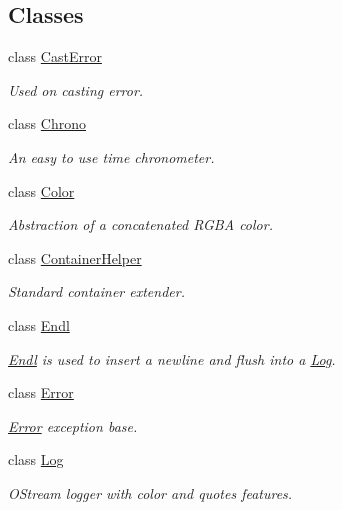 \subsection*{Classes}
\begin{DoxyCompactItemize}
\item 
class \mbox{\hyperlink{classo_a_1_1_cast_error}{Cast\+Error}}
\begin{DoxyCompactList}\small\item\em Used on casting error. \end{DoxyCompactList}\item 
class \mbox{\hyperlink{classo_a_1_1_chrono}{Chrono}}
\begin{DoxyCompactList}\small\item\em An easy to use time chronometer. \end{DoxyCompactList}\item 
class \mbox{\hyperlink{classo_a_1_1_color}{Color}}
\begin{DoxyCompactList}\small\item\em Abstraction of a concatenated R\+G\+BA color. \end{DoxyCompactList}\item 
class \mbox{\hyperlink{classo_a_1_1_container_helper}{Container\+Helper}}
\begin{DoxyCompactList}\small\item\em Standard container extender. \end{DoxyCompactList}\item 
class \mbox{\hyperlink{classo_a_1_1_endl}{Endl}}
\begin{DoxyCompactList}\small\item\em \mbox{\hyperlink{classo_a_1_1_endl}{Endl}} is used to insert a newline and flush into a \mbox{\hyperlink{classo_a_1_1_log}{Log}}. \end{DoxyCompactList}\item 
class \mbox{\hyperlink{classo_a_1_1_error}{Error}}
\begin{DoxyCompactList}\small\item\em \mbox{\hyperlink{classo_a_1_1_error}{Error}} exception base. \end{DoxyCompactList}\item 
class \mbox{\hyperlink{classo_a_1_1_log}{Log}}
\begin{DoxyCompactList}\small\item\em O\+Stream logger with color and quotes features. \end{DoxyCompactList}\item 

\end{DoxyCompactItemize}
